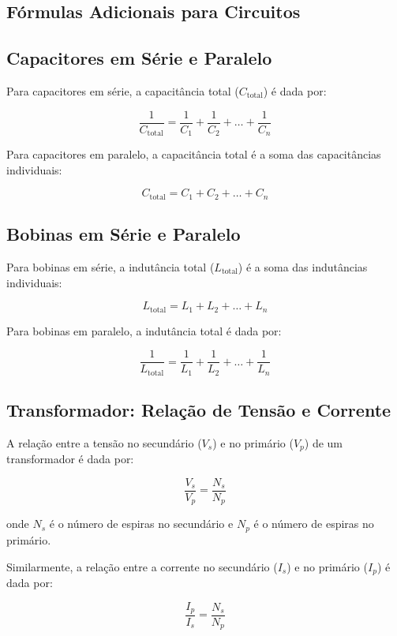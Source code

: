 \documentclass{article}
\begin{document}
\begin{itemize}
    \section*{Fórmulas Adicionais para Circuitos}

\subsection*{Capacitores em Série e Paralelo}

Para capacitores em série, a capacitância total (\(C_{\text{total}}\)) é dada por:

\[
\frac{1}{{C_{\text{total}}}} = \frac{1}{{C_1}} + \frac{1}{{C_2}} + \ldots + \frac{1}{{C_n}}
\]

Para capacitores em paralelo, a capacitância total é a soma das capacitâncias individuais:

\[
C_{\text{total}} = C_1 + C_2 + \ldots + C_n
\]

\subsection*{Bobinas em Série e Paralelo}

Para bobinas em série, a indutância total (\(L_{\text{total}}\)) é a soma das indutâncias individuais:

\[
L_{\text{total}} = L_1 + L_2 + \ldots + L_n
\]

Para bobinas em paralelo, a indutância total é dada por:

\[
\frac{1}{{L_{\text{total}}}} = \frac{1}{{L_1}} + \frac{1}{{L_2}} + \ldots + \frac{1}{{L_n}}
\]

\subsection*{Transformador: Relação de Tensão e Corrente}

A relação entre a tensão no secundário (\(V_s\)) e no primário (\(V_p\)) de um transformador é dada por:

\[
\frac{{V_s}}{{V_p}} = \frac{{N_s}}{{N_p}}
\]

onde \(N_s\) é o número de espiras no secundário e \(N_p\) é o número de espiras no primário.

Similarmente, a relação entre a corrente no secundário (\(I_s\)) e no primário (\(I_p\)) é dada por:

\[
\frac{{I_p}}{{I_s}} = \frac{{N_s}}{{N_p}}
\]

\end{itemize}
\end{document}
